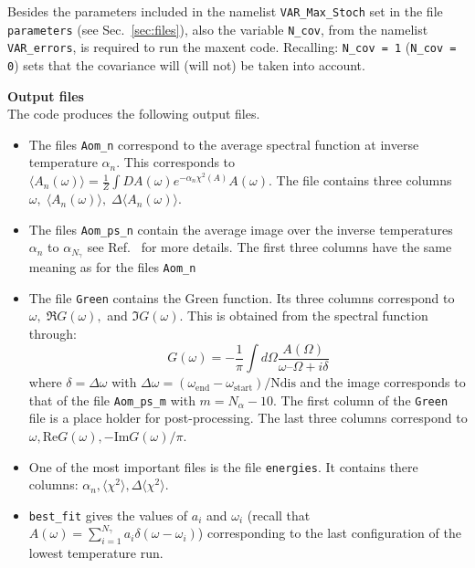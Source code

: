 Besides the parameters included in the namelist \texttt{VAR\_Max\_Stoch} set in the file \texttt{parameters} (see Sec.~\ref{sec:files}), also the variable \texttt{N\_cov}, from the namelist \texttt{VAR\_errors}, is required to run the maxent code. Recalling: \texttt{N\_cov = 1} (\texttt{N\_cov = 0}) sets that the covariance will (will not) be taken into account.


\noindent
\textbf{Output files} \\
The code produces  the following output files.
\begin{itemize}
\item The files  \texttt{Aom\_n}  correspond to the average spectral function at inverse  temperature  $ \alpha_n $. This corresponds to
$  \langle A_n(\omega) \rangle =   \frac{1}{Z}   \int DA(\omega)    e^{-\alpha_n \chi^{2}(A)  } A(\omega). $
The file contains three columns  $ \omega, \;  \langle A_n(\omega) \rangle , \;  \Delta \langle A_n(\omega) \rangle $.

\item The files \texttt{Aom\_ps\_n}   contain the average image over  the  inverse   temperatures  $ \alpha_n $ to $ \alpha_{N_\gamma} $  see Ref.~\cite{Beach04a} for more details.   
 The first three columns have the same meaning as for the files \texttt{Aom\_n}

\item The file \texttt{Green} contains the Green function. Its three columns correspond to $ \omega, \;   \Re G(\omega),$ and $\Im G(\omega)  $.  This is obtained from the spectral function through:
\begin{equation}
 G(\omega) =  -\frac{1}{\pi} \int d \Omega   \frac{A(\Omega)}{\omega – \Omega + i \delta}
 \end{equation}
where  $ \delta =  \Delta \omega$ with $ \Delta \omega = (\omega_\text{end} -  \omega_\text{start})/\text{Ndis}$ and the image corresponds to that of the file \texttt{Aom\_ps\_m} with $ m = N_{\alpha} -10 $. 
The first column of the  \texttt{Green}  file is a place holder for post-processing. The last three columns   correspond to $\omega, \text{Re} G(\omega) ,   - \text{Im} G(\omega)/\pi $. 

\item  One of the most important files is the file  \texttt{energies}. It contains there columns:  $ \alpha_n, \langle \chi^2 \rangle, \Delta \langle \chi^2 \rangle $.

\item   \texttt{best\_fit}  gives the values of $a_i$ and $\omega_i$   (recall that $ A(\omega)  = \sum_{i=1}^{N_{\gamma}} a_{i} \delta \left( \omega - \omega_i \right)$) corresponding to the last configuration of the  lowest temperature run.


\end{itemize}
